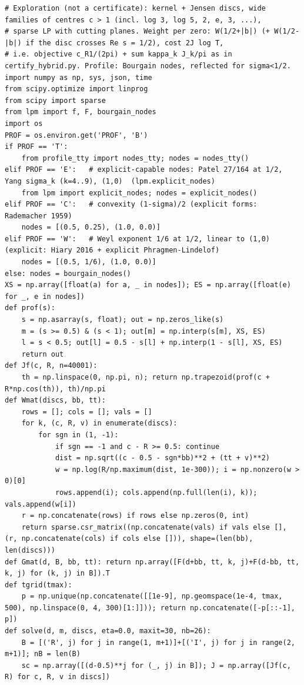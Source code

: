 \documentclass[11pt,reqno]{amsart}
\numberwithin{equation}{section}
\theoremstyle{definition}
\theoremstyle{remark}
\begin{document}
\begin{lstlisting}
# Exploration (not a certificate): kernel + Jensen discs, wide families of centres c > 1 (incl. log 3, log 5, 2, e, 3, ...),
# sparse LP with cutting planes. Weight per zero: W(1/2+|b|) (+ W(1/2-|b|) if the disc crosses Re s = 1/2), cost 2J log T,
# i.e. objective c_R1/(2pi) + sum kappa_k J_k/pi as in certify_hybrid.py. Profile: Bourgain nodes, reflected for sigma<1/2.
import numpy as np, sys, json, time
from scipy.optimize import linprog
from scipy import sparse
from lpm import f, F, bourgain_nodes
import os
PROF = os.environ.get('PROF', 'B')
if PROF == 'T':
    from profile_tty import nodes_tty; nodes = nodes_tty()
elif PROF == 'E':   # explicit-capable nodes: Patel 27/164 at 1/2, Yang sigma_k (k=4..9), (1,0)  (lpm.explicit_nodes)
    from lpm import explicit_nodes; nodes = explicit_nodes()
elif PROF == 'C':   # convexity (1-sigma)/2 (explicit forms: Rademacher 1959)
    nodes = [(0.5, 0.25), (1.0, 0.0)]
elif PROF == 'W':   # Weyl exponent 1/6 at 1/2, linear to (1,0) (explicit: Hiary 2016 + explicit Phragmen-Lindelof)
    nodes = [(0.5, 1/6), (1.0, 0.0)]
else: nodes = bourgain_nodes()
XS = np.array([float(a) for a, _ in nodes]); ES = np.array([float(e) for _, e in nodes])
def prof(s):
    s = np.asarray(s, float); out = np.zeros_like(s)
    m = (s >= 0.5) & (s < 1); out[m] = np.interp(s[m], XS, ES)
    l = s < 0.5; out[l] = 0.5 - s[l] + np.interp(1 - s[l], XS, ES)
    return out
def Jf(c, R, n=40001):
    th = np.linspace(0, np.pi, n); return np.trapezoid(prof(c + R*np.cos(th)), th)/np.pi
def Wmat(discs, bb, tt):
    rows = []; cols = []; vals = []
    for k, (c, R, v) in enumerate(discs):
        for sgn in (1, -1):
            if sgn == -1 and c - R >= 0.5: continue
            dist = np.sqrt((c - 0.5 - sgn*bb)**2 + (tt + v)**2)
            w = np.log(R/np.maximum(dist, 1e-300)); i = np.nonzero(w > 0)[0]
            rows.append(i); cols.append(np.full(len(i), k)); vals.append(w[i])
    r = np.concatenate(rows) if rows else np.zeros(0, int)
    return sparse.csr_matrix((np.concatenate(vals) if vals else [], (r, np.concatenate(cols) if cols else [])), shape=(len(bb), len(discs)))
def Gmat(d, B, bb, tt): return np.array([F(d+bb, tt, k, j)+F(d-bb, tt, k, j) for (k, j) in B]).T
def tgrid(tmax):
    p = np.unique(np.concatenate([[1e-9], np.geomspace(1e-4, tmax, 500), np.linspace(0, 4, 300)[1:]])); return np.concatenate([-p[::-1], p])
def solve(d, m, discs, eta=0.0, maxit=30, nb=26):
    B = [('R', j) for j in range(1, m+1)]+[('I', j) for j in range(2, m+1)]; nB = len(B)
    sc = np.array([(d-0.5)**j for (_, j) in B]); J = np.array([Jf(c, R) for c, R, v in discs])

\end{lstlisting}
\end{document}
